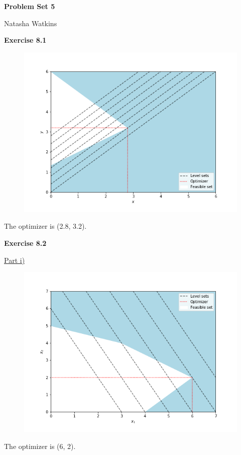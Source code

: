 \documentclass[letterpaper,12pt]{article}
\begin{document}
\textbf{\large Problem Set 5}

Natasha Watkins

\vspace{5mm}

\textbf{Exercise 8.1}
\begin{figure}[H]
	\centering
	\includegraphics[scale=0.45]{plot1.png}
	\label{plot1}
\end{figure}
The optimizer is (2.8, 3.2).

\textbf{Exercise 8.2}

\underline{Part i)}
\begin{figure}[H]
	\centering
	\includegraphics[scale=0.45]{plot2.png}
	\label{plot1}
\end{figure}
The optimizer is (6, 2).
\end{document}
